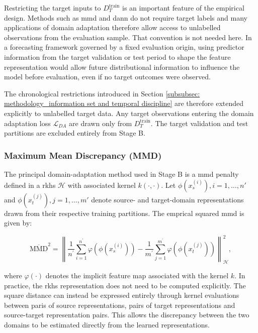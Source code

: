 Restricting the target inputs to $D_T^\text{train}$ is an important feature of the empirical design. Methods such as \ac{mmd} and \ac{dann} do not require target labels and many applications of domain adaptation therefore allow access to unlabelled observations from the evaluation sample. That convention is not needed here. In a forecasting framework governed by a fixed evaluation origin, using predictor information from the target validation or test period to shape the feature representation would allow future distributional information to influence the model before evaluation, even if no target outcomes were observed. 

The chronological restrictions introduced in Section \ref{subsubsec: methodology_information set and temporal discipline} are therefore extended explicitly to unlabelled target data. Any target observations entering the domain adaptation loss $\mathcal L_ {DA}$ are drawn only from $D_T^\text{train}$. The target validation and test partitions are excluded entirely from Stage B.

\subsubsection{Maximum Mean Discrepancy (MMD)} \label{subsubsec: methodology_stage b_mmd}
The principal domain-adaptation method used in Stage B is a \ac{mmd} penalty defined in a \ac{rkhs} $\mathcal H$ with associated kernel $k(\cdot, \cdot)$. Let $\phi(x_s^{(i)}), i=1,\ldots,n'$ and $\phi(x_t^{(j)}), j=1,\ldots,m'$ denote source- and target-domain representations drawn from their respective training partitions. The emprical squared \ac{mmd} is given by:


\begin{equation}
\overline{\mathrm{MMD}}^2=\left\|\frac{1}{n^{\prime}} \sum_{i=1}^{n^{\prime}} \varphi\left(\phi\left(x_s^{(i)}\right)\right)-\frac{1}{m^{\prime}} \sum_{j=1}^{m^{\prime}} \varphi\left(\phi\left(x_t^{(j)}\right)\right)\right\|_{\mathcal{H}}^2,
\end{equation}

\noindent where $\varphi(\cdot)$ denotes the implicit feature map associated with the kernel $k$. In practice, the \ac{rkhs} representation does not need to be computed explicitly. The square distance can instead be expressed entirely through kernel evaluations between paris of source representations, pairs of target representations and source-target representation pairs. This allows the discrepancy between the two domains to be estimated directly from the learned representations.

